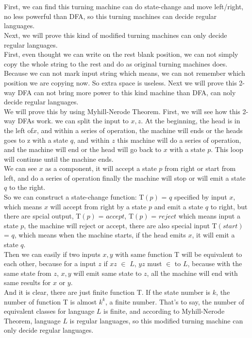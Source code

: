 \documentclass[11pt]{article}
\begin{document}
\part{}
First, we can find this turning machine can do state-change and move left/right, no less powerful than DFA, so this turning machines can decide regular languages. \\
Next, we will prove this kind of modified turning machines can only decide regular languages. \\
First, even thought we can write on the rest blank position, we can not simply copy the whole string to the rest and do as original turning machines does.
Because we can not mark input string which means, we can not remember which position we are copying now. So extra space is useless. Next we will prove this 2-way DFA can not bring more power to this kind machine than DFA, can noly decide regular languages. \\
We will prove this by using Myhill-Nerode Theorem. First, we will see how this 2-way DFAs work.
we can split the input to $x, z$. At the beginning, the head is in the left of$x$, and within a series of operation, the machine will ends or the heads goes to z
with a state $q$, and within $z$ this machine will do a series of operation, and the machine will end or the head will go back to $x$ with a state $p$. This loop will continue until the machine ends.\\
We can see $x$ as a component, it will accept a state $p$ from right or start from left, and do a series of operation finally the machine will stop or will emit a state $q$ to the right.\\
So we can construct a state-change function: T$(p)$ = $q$ specified by input $x$, which means $x$ will accept from right by a state $p$ and emit a state $q$ to right, but there are spcial output, T$(p)$ = $accept$, T$(p)$ = $reject$ which means input a state $p$, the machine will reject or accept, there are also special input T$(start)$ = $q$, which means when the machine starts, if the head emits $x$, it will emit a state $q$. \\
Then we can easily if two inputs $x, y$ with same function T will be equivalent to each other, because for a input $z$ if $xz$ $\in$ $L$, $yz$ must $\in$ to $L$, because with the same state from $z$, $x, y$ will emit same state to $z$, all the machine will end with same results for $x$ or $y$. \\  
And it is clear, there are just finite function T. If the state number is $k$, the number of function T is almost $k^{k}$, a finite number. That's to say,
the number of equivalent classes for language $L$ is finite, and according to Myhill-Nerode Theorem, language $L$ is regular languages, so this modified turning machine can only decide regular languages. 
\part{}
\end{document}
